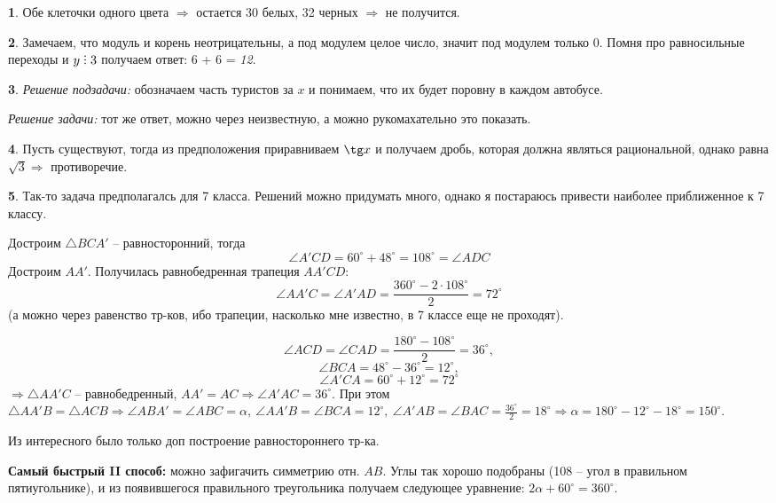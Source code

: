 \documentclass[14pt, a4paper]{extarticle}
\theoremstyle{definition}
\newtheorem{problem}{}
\theoremstyle{definition}
\theoremstyle{remark}
\numberwithin{equation}{section}
\DeclareRobustCommand{\divby}{%
  \mathrel{\text{\vbox{\baselineskip.65ex\lineskiplimit0pt\hbox{.}\hbox{.}\hbox{.}}}}%
}
\begin{document}
\begin{problem}
    Обе клеточки одного цвета $\Rightarrow$ остается 30 белых, 32 черных
    $\Rightarrow$ не получится.
\end{problem}

\begin{problem}
    Замечаем, что модуль и корень неотрицательны, а под модулем 
    целое число, значит под модулем только 0. Помня про равносильные
    переходы и $y \divby 3$ получаем ответ: 6 + 6 = \textit{12}.
\end{problem}

\begin{problem}
    \textit{Решение подзадачи:} обозначаем часть туристов за $x$ и понимаем,
    что их будет поровну в каждом автобусе.

    \textit{Решение задачи:} тот же ответ, можно через неизвестную,
    а можно рукомахательно это показать.
\end{problem}

\begin{problem}
    Пусть существуют, тогда из предположения приравниваем $\tg x$ и получаем
    дробь, которая должна являться рациональной, однако равна $\sqrt{3}
    \Rightarrow$ противоречие.
\end{problem}

\begin{problem}
    Так-то задача предполагалсь для 7 класса. Решений можно придумать много,
    однако я постараюсь привести наиболее приближенное к 7 классу.
    
    Достроим $\triangle BCA'$ -- равносторонний, тогда 
    \[\angle A'CD = 60^\circ + 48^\circ = 108^\circ = \angle ADC\] 
    Достроим $AA'$. Получилась равнобедренная трапеция $AA'CD$:
    \[\angle AA'C = \angle A'AD = 
    \frac{360^\circ - 2 \cdot 108^\circ}{2} = 72^\circ\] 
    (а можно через равенство тр-ков, ибо трапеции, насколько
    мне известно, в 7 классе еще не проходят).

    \[\angle ACD = \angle CAD = \frac{180^\circ - 108^\circ}{2} = 36^\circ,\]
    \[\angle BCA = 48^\circ - 36^\circ = 12^\circ,\]
    \[\angle A'CA = 60^\circ + 12^\circ = 72^\circ\]
    $\Rightarrow \triangle AA'C$ -- равнобедренный, $AA' = AC
    \Rightarrow \angle A'AC = 36^\circ.$ При этом $\triangle AA'B = 
    \triangle ACB \Rightarrow \angle ABA' = \angle ABC = \alpha,\ 
    \angle AA'B = \angle BCA = 12^\circ,\ \angle A'AB = \angle 
    BAC = \frac{36^\circ}{2} = 18^\circ \Rightarrow \alpha = 180^\circ
    - 12^\circ - 18^\circ = 150^\circ$.

    Из интересного было только доп построение равностороннего тр-ка.

    \textbf{Самый быстрый II способ:} можно зафигачить симметрию отн. $AB$. Углы так хорошо подобраны
    (108 -- угол в правильном пятиугольнике), и из появившегося правильного
    треугольника получаем следующее уравнение: $2 \alpha + 60^\circ
    = 360^\circ$.

\end{problem}
\end{document}
